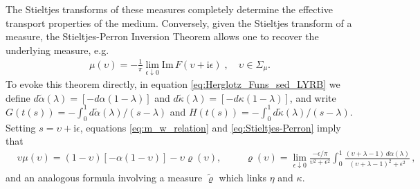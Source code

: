 \documentclass[english,12pt,jmp,graphicx]{revtex4-1}
\newcommand{\I}{\mathrm{i}}
\begin{document}
The Stieltjes transforms of these measures completely 
determine the effective transport properties of the medium. Conversely,
given the Stieltjes transform of a measure, the Stieltjes-Perron
Inversion Theorem \cite{Henrici:1974:v3} allows one to recover the
underlying measure, e.g.   
%
\begin{align}\label{eq:Stieltjes-Perron}
  \mu(\upsilon)=-\frac{1}{\pi}\lim_{\epsilon\downarrow0}\text{Im}\,F(\upsilon+\I\epsilon)\;, \quad
  \upsilon\in\Sigma_\mu. 
\end{align}
%
To evoke this theorem directly, in equation
\eqref{eq:Herglotz_Funs_sed_LYRB} we define 
$d\tilde{\alpha}(\lambda)=[-d\alpha(1-\lambda)]$ and $d\tilde{\kappa}(\lambda)=[-d\kappa(1-\lambda)]$, and write
$G(t(s))=-\int_0^1d\tilde{\alpha}(\lambda)/(s-\lambda)$ and
$H(t(s))=-\int_0^1d\tilde{\kappa}(\lambda)/(s-\lambda)$. Setting $s=\upsilon+\I\epsilon$,
equations \eqref{eq:m_w_relation} and \eqref{eq:Stieltjes-Perron}
imply that  
\begin{align}\label{eq:BM_measure_relationship}
  &\upsilon\mu(\upsilon)=(1-\upsilon)[-\alpha(1-\upsilon)] - \upsilon\varrho(\upsilon), &&
  &\varrho(\upsilon)=%
       \lim_{\epsilon\downarrow 0}\frac{-\epsilon/\pi}{\upsilon^2+\epsilon^2}
         \int_0^1\frac{(\upsilon+\lambda-1)\,d\alpha(\lambda)}{(\upsilon+\lambda-1)^2+\epsilon^2}\,,&&
\end{align}
%
and an analogous formula involving a measure $\tilde{\varrho}$ which links
$\eta$ and $\kappa$.
\end{document}
